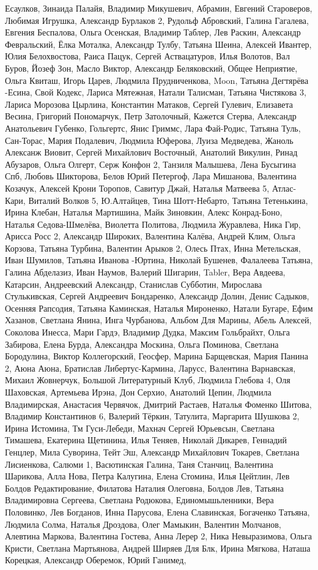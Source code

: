 Есаулков, Зинаида Палайя, Владимир Микушевич, Абрамин, Евгений Староверов, Любимая Игрушка, Александр Бурлаков 2, Рудольф Абровский, Галина Гагалева, Евгения Беспалова, Ольга Осенская, Владимир Таблер, Лев Раскин, Александр Февральский, Ёлка Моталка, Александр Тулбу, Татьяна Шеина, Алексей Ивантер, Юлия Белохвостова, Раиса Пацук, Сергей Аствацатуров, Илья Волотов, Вал Буров, Йозеф Зон, Масло Виктор, Александр Беляковский, Общее Неприятие, Ольга Квиташ, Игорь Царев, Людмила Прудниченкова, Moon, Татьяна Дегтярёва -Есина, Свой Кодекс, Лариса Мятежная, Натали Талисман, Татьяна Чистякова 3, Лариса Морозова Цырлина, Константин Матаков, Сергей Гулевич, Елизавета Весина, Григорий Пономарчук, Петр Затолочный, Кажется Стерва, Александр Анатольевич Губенко, Гольгертс, Янис Гриммс, Лара Фай-Родис, Татьяна Туль, Сан-Торас, Мария Подалевич, Людмила Юферова, Луиза Медведева, Жаноль Алексанж Виовит, Сергей Михайлович Восточный, Анатолий Викулин, Ринад Абузаров, Ольга Олгерт, Серж Конфон 2, Танзиля Малышева, Лена Бусыгина Спб, Любовь Шикторова, Белов Юрий Петергоф, Лара Мишанова, Валентина Козачук, Алексей Крони Торопов, Савитур Джай, Наталья Матвеева 5, Атлас-Кари, Виталий Волков 5, Ю.Алтайцев, Тина Шотт-Небарто, Татьяна Тетенькина, Ирина Клебан, Наталья Мартишина, Майк Зиновкин, Алекс Конрад-Боно, Наталья Седова-Шмелёва, Виолетта Политова, Людмила Журавлева, Ника Гир, Арисса Росс 2, Александр Широких, Валентина Калёва, Андрей Клим, Ольга Корзова, Татьяна Турбина, Валентин Арыков 2, Олесь Птах, Инна Метельская, Иван Шумилов, Татьяна Иванова -Юртина, Николай Бушенев, Фалалеева Татьяна, Галина Абделазиз, Иван Наумов, Валерий Шигарин, Tabler, Вера Авдеева, Катарсин, Андреевский Александр, Станислав Субботин, Мирослава Стулькивская, Сергей Андреевич Бондаренко, Александр Долин, Денис Садыков, Осенняя Рапсодия, Татьяна Каминская, Наталья Мироненко, Натали Бугаре, Ефим Хазанов, Светлана Янина, Инга Чурбанова, Альбом Для Марины, Абель Алексей, Соколова Инесса, Мари Гардэ, Владимир Дудка, Максим Гольбрайхт, Ольга Забирова, Елена Бурда, Александра Москина, Ольга Поминова, Светлана Бородулина, Виктор Коллегорский, Геосфер, Марина Барщевская, Мария Панина 2, Аюна Аюна, Братислав Либертус-Кармина, Ларусс, Валентина Варнавская, Михаил Жовнерчук, Большой Литературный Клуб, Людмила Глебова 4, Оля Шаховская, Артемьева Ирэна, Дон Серхио, Анатолий Цепин, Людмила Владимирская, Анастасия Червячок, Дмитрий Растаев, Наталья Фоменко Шитова, Владимир Константинов 6, Валерий Тёркин, Татулита, Маргарита Шушкова 2, Ирина Истомина, Тм Гуси-Лебеди, Махнач Сергей Юрьевсын, Светлана Тимашева, Екатерина Щетинина, Илья Теняев, Николай Дикарев, Геннадий Генцлер, Мила Суворина, Тейт Эш, Александр Михайлович Токарев, Светлана Лисиенкова, Салюми 1, Васютинская Галина, Таня Станчиц, Валентина Шарикова, Алла Нова, Петра Калугина, Елена Стомина, Илья Цейтлин, Лев Болдов Редактирование, Филатова Наталия Олеговна, Болдов Лев, Татьяна Владимировна Сергеева, Светлана Родюкова, Единомышьленники, Вера Половинко, Лев Богданов, Инна Парусова, Елена Славинская, Богаченко Татьяна, Людмила Солма, Наталья Дроздова, Олег Мамыкин, Валентин Молчанов, Алевтина Маркова, Валентина Гостева, Анна Лерер 2, Ника Невыразимова, Ольга Кристи, Светлана Мартьянова, Андрей Ширяев Для Блк, Ирина Мягкова, Наташа Корецкая, Александр Оберемок, Юрий Ганимед, 